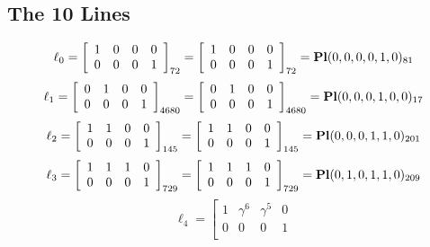 \documentclass{article}
\begin{document}
{\subsection*{The 10 Lines}
$$
\ell_{0} = 
\left[
\begin{array}{*{4}{r}}
1 & 0 & 0 & 0\\
0 & 0 & 0 & 1\\
\end{array}
\right]
_{72}
=
\left[
\begin{array}{*{4}c}
1  & 0  & 0  & 0\\
0  & 0  & 0  & 1\\
\end{array}
\right]_{72}
={\rm\bf Pl}(0,0,0,0,1,0 )_{81}$$
$$
\ell_{1} = 
\left[
\begin{array}{*{4}{r}}
0 & 1 & 0 & 0\\
0 & 0 & 0 & 1\\
\end{array}
\right]
_{4680}
=
\left[
\begin{array}{*{4}c}
0  & 1  & 0  & 0\\
0  & 0  & 0  & 1\\
\end{array}
\right]_{4680}
={\rm\bf Pl}(0,0,0,1,0,0 )_{17}$$
$$
\ell_{2} = 
\left[
\begin{array}{*{4}{r}}
1 & 1 & 0 & 0\\
0 & 0 & 0 & 1\\
\end{array}
\right]
_{145}
=
\left[
\begin{array}{*{4}c}
1  & 1  & 0  & 0\\
0  & 0  & 0  & 1\\
\end{array}
\right]_{145}
={\rm\bf Pl}(0,0,0,1,1,0 )_{201}$$
$$
\ell_{3} = 
\left[
\begin{array}{*{4}{r}}
1 & 1 & 1 & 0\\
0 & 0 & 0 & 1\\
\end{array}
\right]
_{729}
=
\left[
\begin{array}{*{4}c}
1  & 1  & 1  & 0\\
0  & 0  & 0  & 1\\
\end{array}
\right]_{729}
={\rm\bf Pl}(0,1,0,1,1,0 )_{209}$$
$$
\ell_{4} = 
\left[
\begin{array}{*{4}{r}}
1 & \gamma^{6} & \gamma^{5} & 0\\
0 & 0 & 0 & 1\\

\end{array}$$}
\end{document}
